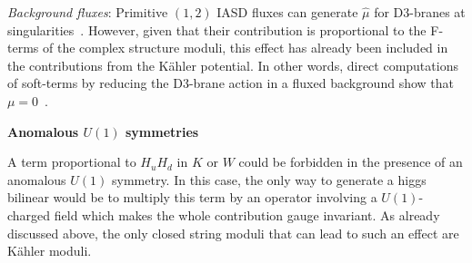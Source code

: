 \documentclass[12pt,a4paper]{book}
\begin{document}
\emph{Background fluxes}: Primitive $(1,2)$ IASD fluxes
can generate $\hat\mu$ for D3-branes at singularities~\cite{Grana:2003ek,Grana:2002nq,Camara:2003ku}. However, given that their contribution is proportional to the F-terms of the complex structure moduli, this effect has already been included in the contributions from the K\"ahler potential. In other words, direct computations of soft-terms by reducing the D3-brane action in a fluxed background show that $\mu=0$~\cite{Grana:2003ek}.\\

\newpage
\item \textbf{Anomalous $U(1)$ symmetries}

A term proportional to $H_u H_d$ in $K$ or $W$ could be forbidden in the presence of an anomalous $U(1)$ symmetry. In this case, the only way to generate a higgs bilinear would be to multiply this term by an operator involving a $U(1)$-charged field which makes the whole contribution gauge invariant. As already discussed above, the only closed string moduli that can lead to such an effect are K\"ahler moduli.\\
\end{document}
